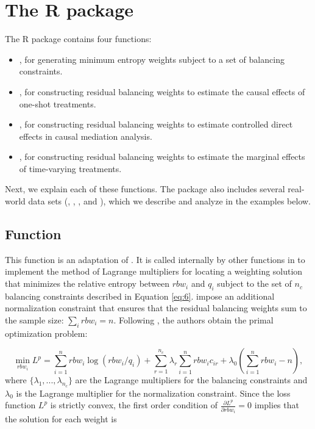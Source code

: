 \hypertarget{r-package}{%
\section{The R package}\label{r-package}}

The R package  contains four functions:

\begin{itemize}
\tightlist
\item
  , for generating minimum entropy weights subject to a set
  of balancing constraints.
\item
  , for constructing residual balancing weights to
  estimate the causal effects of one-shot treatments.
\item
  , for constructing residual balancing weights to
  estimate controlled direct effects in causal mediation analysis.
\item
  , for constructing residual balancing weights to
  estimate the marginal effects of time-varying treatments.
\end{itemize}

Next, we explain each of these functions. The package also includes
several real-world data sets (, ,
, and ), which we describe and
analyze in the examples below.

\hypertarget{eb2}{%
\subsection{\texorpdfstring{Function
}{Function }}\label{eb2}}

This function is an adaptation of  \citep{R-ebal}. It
is called internally by other functions in  to implement
the method of Lagrange multipliers for locating a weighting solution
that minimizes the relative entropy between \(rbw_{i}\) and \(q_{i}\)
subject to the set of \(n_{c}\) balancing constraints described in
Equation \ref{eq:6}. \citet{zhouResidualBalancingMethod2020a} impose an
additional normalization constraint that ensures that the residual
balancing weights sum to the sample size: \(\sum_{i}rbw_{i}=n\).
Following \citet{hainmuellerEntropyBalancingCausal2012}, the authors
obtain the primal optimization problem:

\begin{equation}
\label{eq:8}
\min_{rbw_{i}}L^{p}=\sum^{n}_{i=1}rbw_{i}\log (rbw_{i}/q_{i})+\sum^{n_{c}}_{r=1}\lambda_{r}\sum^{n}_{i=1}rbw_{i}c_{ir}+\lambda_{0}\left(\sum^{n}_{i=1}rbw_{i}-n\right),
\end{equation}
where \(\{\lambda_{1},...,\lambda_{n_{c}}\}\) are the Lagrange
multipliers for the balancing constraints and \(\lambda_{0}\) is the
Lagrange multiplier for the normalization constraint. Since the loss
function \(L^{p}\) is strictly convex, the first order condition of
\(\frac{\partial L^{p}}{\partial rbw_{i}}=0\) implies that the solution
for each weight is

